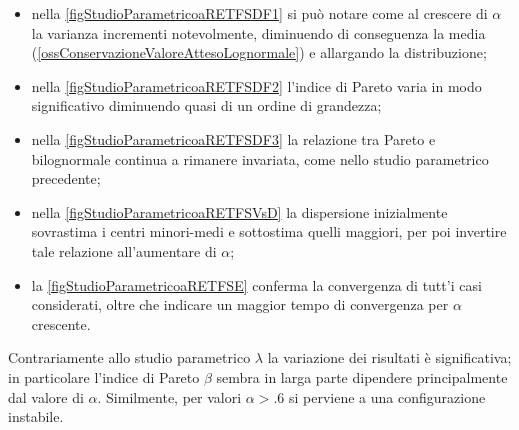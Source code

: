         \begin{itemize}[
          label=\(\diamond\),
        ]
          \item nella \cref{figStudioParametricoaRETFSDF1} si può notare come al crescere di \(\alpha\) la varianza incrementi notevolmente, diminuendo di conseguenza la media (\cref{ossConservazioneValoreAttesoLognormale}) e allargando la distribuzione;
          \item nella \cref{figStudioParametricoaRETFSDF2} l'indice di Pareto varia in modo significativo diminuendo quasi di un ordine di grandezza;
          \item nella \cref{figStudioParametricoaRETFSDF3} la relazione tra Pareto e bilognormale continua a rimanere invariata, come nello studio parametrico precedente;
          \item nella \cref{figStudioParametricoaRETFSVsD} la dispersione inizialmente sovrastima i centri minori-medi e sottostima quelli maggiori, per poi invertire tale relazione all'aumentare di \(\alpha\);
          \item la \cref{figStudioParametricoaRETFSE} conferma la convergenza di tutt'i casi considerati, oltre che indicare un maggior tempo di convergenza per \(\alpha\) crescente.
        \end{itemize}


        Contrariamente allo studio parametrico \(\lambda\) la variazione dei risultati è significativa; in particolare l'indice di Pareto \(\beta\) sembra in larga parte dipendere principalmente dal valore di \(\alpha\). Similmente, per valori \(\alpha>\num{.6}\) si perviene a una configurazione instabile.

